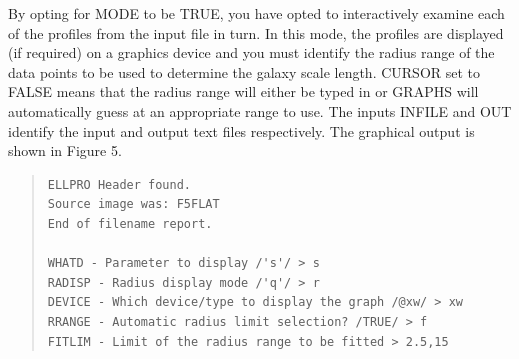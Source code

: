\documentclass[twoside,11pt]{article}
\newenvironment{myquote}{\begin{quote}\begin{small}}{\end{small}\end{quote}}
\begin{document}
By opting for MODE to be TRUE, you have opted to interactively examine 
each of the profiles from the input file in turn. In this mode, the profiles are
displayed (if required) on a graphics device and you must
identify the radius range of the data points to be used to determine the
galaxy scale length. CURSOR set to FALSE means that the radius range will
either be typed in or GRAPHS will automatically guess at an
appropriate range to use. The inputs INFILE and OUT identify the input and 
output text files respectively. The graphical output is shown in 
Figure 5.
 
\begin{myquote}
\begin{verbatim}
ELLPRO Header found.
Source image was: F5FLAT
End of filename report.
 
WHATD - Parameter to display /'s'/ > s
RADISP - Radius display mode /'q'/ > r
DEVICE - Which device/type to display the graph /@xw/ > xw
RRANGE - Automatic radius limit selection? /TRUE/ > f
FITLIM - Limit of the radius range to be fitted > 2.5,15 
\end{verbatim}
\end{myquote}
\end{document}
